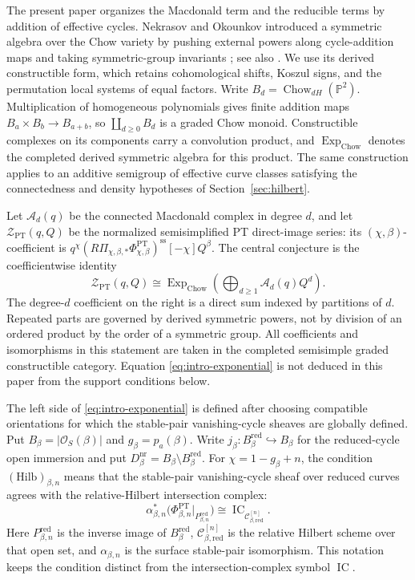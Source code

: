\documentclass[11pt,reqno]{amsart}
\theoremstyle{definition}
\newcommand{\Pp}{\mathbb P}
\newcommand{\Ocal}{\mathcal O}
\newcommand{\IC}{\operatorname{IC}}
\newcommand{\PT}{\operatorname{PT}}
\newcommand{\red}{\mathrm{red}}
\newcommand{\nr}{\mathrm{nr}}
\newcommand{\ExpChow}{\operatorname{Exp}_{\mathrm{Chow}}}
\begin{document}
The present paper organizes the Macdonald term and the reducible terms by
addition of effective cycles.  Nekrasov and Okounkov introduced a symmetric
algebra over the Chow variety by pushing external powers along cycle-addition
maps and taking symmetric-group invariants
\cite[Section~2.3.5]{NekrasovOkounkov}; see also
\cite[Section~5.3.3]{OkounkovTakagi}.  We use its derived constructible form,
which retains cohomological shifts, Koszul signs, and the permutation local
systems of equal factors.  Write
$B_d=\operatorname{Chow}_{dH}(\Pp^2)$.  Multiplication of homogeneous
polynomials gives finite addition maps $B_a\times B_b\to B_{a+b}$, so
$\coprod_{d\ge0}B_d$ is a graded Chow monoid.  Constructible complexes on
its components carry a convolution product, and $\ExpChow$ denotes the
completed derived symmetric algebra for this product.  The same construction
applies to an additive semigroup of effective curve classes satisfying the
connectedness and density hypotheses of Section~\ref{sec:hilbert}.

Let $\mathcal A_d(q)$ be the connected Macdonald complex in degree $d$, and
let $\mathcal Z_{\PT}(q,Q)$ be the normalized semisimplified PT
direct-image series: its $(\chi,\beta)$-coefficient is
$q^\chi(R\Pi_{\chi,\beta,*}\Phi_{\chi,\beta}^{\PT})^{\mathrm{ss}}
[-\chi]Q^\beta$.  The central conjecture is the coefficientwise identity
\begin{equation}\label{eq:intro-exponential}
  \mathcal Z_{\PT}(q,Q)
  \cong
  \ExpChow\!\left(\bigoplus_{d\ge1}\mathcal A_d(q)Q^d\right).
\end{equation}
The degree-$d$ coefficient on the right is a direct sum indexed by
partitions of $d$.  Repeated parts are governed by derived symmetric powers,
not by division of an ordered product by the order of a symmetric group.
All coefficients and isomorphisms in this statement are taken in the
completed semisimple graded constructible category.  Equation
\eqref{eq:intro-exponential} is not deduced in this paper from the support
conditions below.

The left side of \eqref{eq:intro-exponential} is defined after choosing
compatible orientations for which the stable-pair vanishing-cycle sheaves
are globally defined.  Put $B_\beta=|\Ocal_S(\beta)|$ and
$g_\beta=p_a(\beta)$.  Write
$j_\beta:B_\beta^{\red}\hookrightarrow B_\beta$ for the reduced-cycle open
immersion and put $D_\beta^{\nr}=B_\beta\setminus B_\beta^{\red}$.  For
$\chi=1-g_\beta+n$, the condition
$(\mathrm{Hilb})_{\beta,n}$ means that the stable-pair vanishing-cycle sheaf
over reduced curves agrees with the relative-Hilbert intersection complex:
\begin{equation}\label{eq:intro-hilb-condition}
 \alpha_{\beta,n}^*
 \bigl(\Phi_{\beta,n}^{\PT}|_{P_{\beta,n}^{\red}}\bigr)
 \cong\IC_{\mathcal C_{\beta,\red}^{[n]}}.
\end{equation}
Here $P_{\beta,n}^{\red}$ is the inverse image of $B_\beta^{\red}$,
$\mathcal C_{\beta,\red}^{[n]}$ is the relative Hilbert scheme over that
open set, and $\alpha_{\beta,n}$ is the surface stable-pair isomorphism.  This notation
keeps the condition distinct from the intersection-complex symbol $\IC$.
\end{document}
